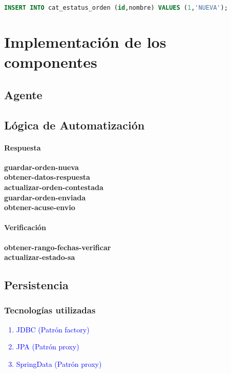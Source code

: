 \begin{lstlisting}[language=SQL, caption={Sentencia insertar un registro.}, label={lst:sql-insert}]
INSERT INTO cat_estatus_orden (id,nombre) VALUES (1,'NUEVA');
\end{lstlisting}

%

\section{Implementación de los componentes}
\subsection{Agente}
\subsection{Lógica de Automatización}
	\paragraph{Respuesta\\}
		\textbf{guardar-orden-nueva}\\
		\textbf{obtener-datos-respuesta}\\
		\textbf{actualizar-orden-contestada}\\
		\textbf{guardar-orden-enviada}\\
		\textbf{obtener-acuse-envio}
	\paragraph{Verificación\\}
		\textbf{obtener-rango-fechas-verificar}\\
		\textbf{actualizar-estado-sa}

\subsection{Persistencia}
\subsubsection{Tecnologías utilizadas}
\textcolor{blue}{
\begin{enumerate}
	\item JDBC 			(Patrón factory)
	\item JPA			(Patrón proxy)
	\item SpringData	(Patrón proxy)
\end{enumerate}
}

